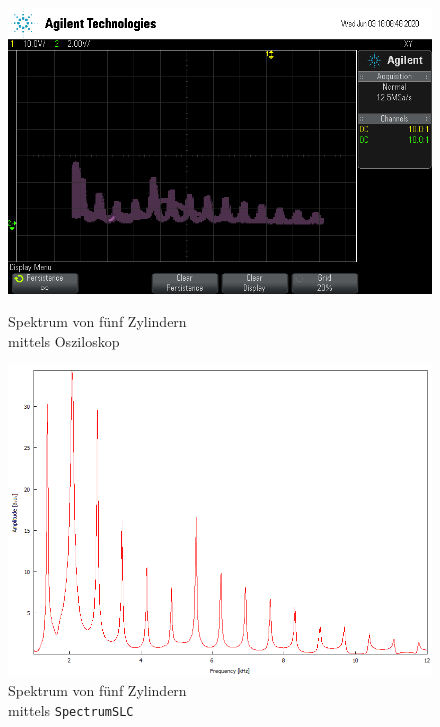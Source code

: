 \begin{figure}
    \begin{minipage}[b]{.4\linewidth} %
        \includegraphics[width=\linewidth]{figure/5Zylinder.png}
        \vspace*{0.008cm}
        \caption{Spektrum von fünf Zylindern\\ mittels Osziloskop}
     \end{minipage}
     \hspace{.1\linewidth}%
     \begin{minipage}[b]{.4\linewidth} %
        \includegraphics[width=\linewidth]{figure/5_Zylinder.png}
        \caption{Spektrum von fünf Zylindern\\ mittels \texttt{SpectrumSLC}}
     \end{minipage}
\end{figure}
